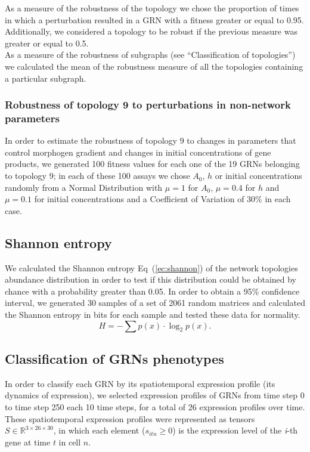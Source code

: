 \documentclass[10pt,letterpaper]{article}
\begin{document}
As a measure of the robustness of the topology we chose the proportion of times
in which a perturbation resulted in a GRN with a fitness greater or equal to
0.95. Additionally, we considered a topology to be robust if the previous
measure was greater or equal to 0.5.\\

As a measure of the robustness of subgraphs (see “Classification of topologies”)
we calculated the mean of the robustness measure of all the topologies
containing a particular subgraph.\\

\subsubsection*{Robustness of topology 9 to perturbations in non-network parameters}

In order to estimate the robustness of topology 9 to changes in parameters that
control morphogen gradient and changes in initial concentrations of gene
products, we generated 100 fitness values for each one of the 19 GRNs
belonging to topology 9; in each of these 100 assays we chose $A_0$, $h$ or
initial concentrations randomly from a Normal Distribution with $\mu = 1$ for
$A_0$, $\mu = 0.4$ for $h$ and $\mu = 0.1$ for initial concentrations and a
Coefficient of Variation of 30\% in each case.

\subsection*{Shannon entropy}

We calculated the Shannon entropy Eq~(\ref{ec:shannon}) of the network
topologies abundance distribution in order to test if this distribution could be obtained
by chance with a probability greater than 0.05. In order to obtain a 95\%
confidence interval, we generated 30 samples of a set of 2061 random matrices
and calculated the Shannon entropy in bits for each sample and tested these data
for normality.
\begin{equation}
 H = -\sum p(x) \cdot \log_{2}p(x).
 \label{ec:shannon}
\end{equation}

\subsection*{Classification of GRNs phenotypes}

In order to classify each GRN by its spatiotemporal expression profile (its
dynamics of expression), we selected expression profiles of GRNs from time step
0 to time step 250 each 10 time steps, for a total of 26 expression profiles
over time. These spatiotemporal expression profiles were represented as tensors
$S \in \mathbb{R}^{3 \times 26 \times 30}$, in which each element ($s_{itn} \geq
0$) is the expression level of the \emph{i}-th gene at time $t$ in cell $n$.\\
\end{document}
